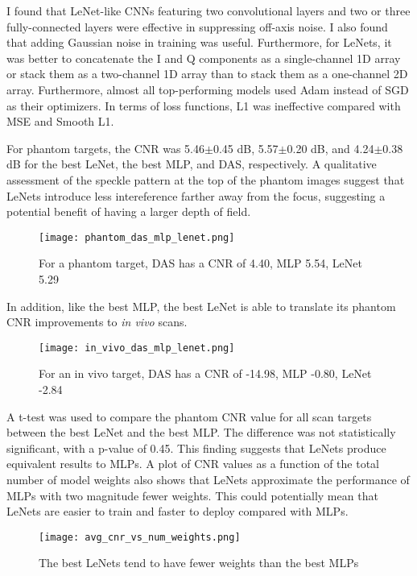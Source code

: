   I found that LeNet-like CNNs featuring two convolutional layers and two or three fully-connected layers were effective in suppressing off-axis noise. I also found that adding Gaussian noise in training was useful. Furthermore, for LeNets, it was better to concatenate the I and Q components as a single-channel 1D array or stack them as a two-channel 1D array than to stack them as a one-channel 2D array. Furthermore, almost all top-performing models used Adam instead of SGD as their optimizers. In terms of loss functions, L1 was ineffective compared with MSE and Smooth L1.

  For phantom targets, the CNR was 5.46$\pm$0.45 dB, 5.57$\pm$0.20 dB, and 4.24$\pm$0.38 dB for the best LeNet, the best MLP, and DAS, respectively. A qualitative assessment of the speckle pattern at the top of the phantom images suggest that LeNets introduce less intereference farther away from the focus, suggesting a potential benefit of having a larger depth of field.

  \begin{figure}[htbp]
    \centerline{\texttt{[image: phantom\_das\_mlp\_lenet.png]}}
    \caption{For a phantom target, DAS has a CNR of 4.40, MLP 5.54, LeNet 5.29}
    \label{fig}
  \end{figure}


  In addition, like the best MLP, the best LeNet is able to translate its phantom CNR improvements to \textit{in vivo} scans.
  \begin{figure}[htbp]
    \centerline{\texttt{[image: in\_vivo\_das\_mlp\_lenet.png]}}
    \caption{For an in vivo target, DAS has a CNR of -14.98, MLP -0.80, LeNet -2.84}
    \label{fig}
  \end{figure}


  A t-test was used to compare the phantom CNR value for all scan targets between the best LeNet and the best MLP. The difference was not statistically significant, with a p-value of 0.45. This finding suggests that LeNets produce equivalent results to MLPs. A plot of CNR values as a function of the total number of model weights also shows that LeNets approximate the performance of MLPs with two magnitude fewer weights. This could potentially mean that LeNets are easier to train and faster to deploy compared with MLPs.

  \begin{figure}
    \centerline{\texttt{[image: avg\_cnr\_vs\_num\_weights.png]}}
    \caption{The best LeNets tend to have fewer weights than the best MLPs}
    \label{fig}
  \end{figure}


